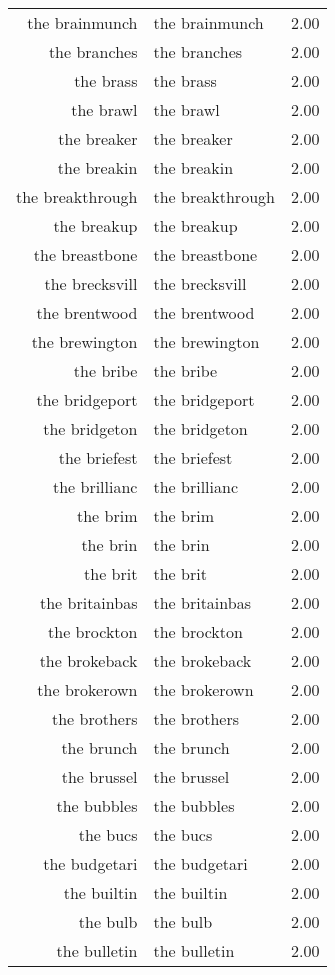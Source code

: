 \begin{table}[ht]
\begin{tabular}{rlr}
  the brainmunch & the brainmunch & 2.00 \\ 
  the branches & the branches & 2.00 \\ 
  the brass & the brass & 2.00 \\ 
  the brawl & the brawl & 2.00 \\ 
  the breaker & the breaker & 2.00 \\ 
  the breakin & the breakin & 2.00 \\ 
  the breakthrough & the breakthrough & 2.00 \\ 
  the breakup & the breakup & 2.00 \\ 
  the breastbone & the breastbone & 2.00 \\ 
  the brecksvill & the brecksvill & 2.00 \\ 
  the brentwood & the brentwood & 2.00 \\ 
  the brewington & the brewington & 2.00 \\ 
  the bribe & the bribe & 2.00 \\ 
  the bridgeport & the bridgeport & 2.00 \\ 
  the bridgeton & the bridgeton & 2.00 \\ 
  the briefest & the briefest & 2.00 \\ 
  the brillianc & the brillianc & 2.00 \\ 
  the brim & the brim & 2.00 \\ 
  the brin & the brin & 2.00 \\ 
  the brit & the brit & 2.00 \\ 
  the britainbas & the britainbas & 2.00 \\ 
  the brockton & the brockton & 2.00 \\ 
  the brokeback & the brokeback & 2.00 \\ 
  the brokerown & the brokerown & 2.00 \\ 
  the brothers & the brothers & 2.00 \\ 
  the brunch & the brunch & 2.00 \\ 
  the brussel & the brussel & 2.00 \\ 
  the bubbles & the bubbles & 2.00 \\ 
  the bucs & the bucs & 2.00 \\ 
  the budgetari & the budgetari & 2.00 \\ 
  the builtin & the builtin & 2.00 \\ 
  the bulb & the bulb & 2.00 \\ 
  the bulletin & the bulletin & 2.00 \\ 

\end{tabular}
\end{table}
